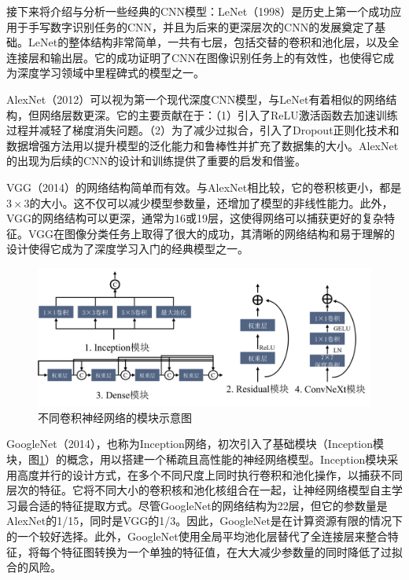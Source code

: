 接下来将介绍与分析一些经典的CNN模型：LeNet\cite{lecun1998gradient}（1998）是历史上第一个成功应用于手写数字识别任务的CNN，并且为后来的更深层次的CNN的发展奠定了基础。LeNet的整体结构非常简单，一共有七层，包括交替的卷积和池化层，以及全连接层和输出层。它的成功证明了CNN在图像识别任务上的有效性，也使得它成为深度学习领域中里程碑式的模型之一。

AlexNet\cite{krizhevsky2012imagenet}（2012）可以视为第一个现代深度CNN模型，与LeNet有着相似的网络结构，但网络层数更深。它的主要贡献在于：（1）引入了ReLU激活函数去加速训练过程并减轻了梯度消失问题。（2）为了减少过拟合，引入了Dropout\cite{srivastava2014dropout}正则化技术和数据增强方法用以提升模型的泛化能力和鲁棒性并扩充了数据集的大小。AlexNet的出现为后续的CNN的设计和训练提供了重要的启发和借鉴。

VGG\cite{Simonyan2014VeryDC}（2014）的网络结构简单而有效。与AlexNet相比较，它的卷积核更小，都是\(3\times3\)的大小。这不仅可以减少模型参数量，还增加了模型的非线性能力。此外，VGG的网络结构可以更深，通常为16或19层，这使得网络可以捕获更好的复杂特征。VGG在图像分类任务上取得了很大的成功，其清晰的网络结构和易于理解的设计使得它成为了深度学习入门的经典模型之一。

\begin{figure}[ht]
    \centering
    \includegraphics[width=\textwidth]{figures/chap02_block.png}
    \caption{不同卷积神经网络的模块示意图}
    \label{fig:chap02_block}
\end{figure}

GoogleNet\cite{szegedy2015going}（2014），也称为Inception网络，初次引入了基础模块（Inception模块，图\ref{fig:chap02_block}）的概念，用以搭建一个稀疏且高性能的神经网络模型。Inception模块采用高度并行的设计方式，在多个不同尺度上同时执行卷积和池化操作，以捕获不同层次的特征。它将不同大小的卷积核和池化核组合在一起，让神经网络模型自主学习最合适的特征提取方式。尽管GoogleNet的网络结构为22层，但它的参数量是AlexNet的1/15，同时是VGG的1/3。因此，GoogleNet是在计算资源有限的情况下的一个较好选择。此外，GoogleNet使用全局平均池化层替代了全连接层来整合特征，将每个特征图转换为一个单独的特征值，在大大减少参数量的同时降低了过拟合的风险。

